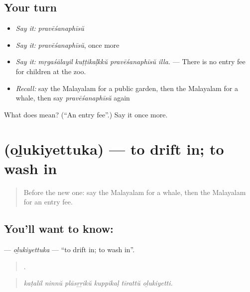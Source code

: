\subsection*{Your turn}
\begin{itemize}
\raggedright
  \item \emph{Say it:} \emph{pravēśanaphīsŭ}
  \item \emph{Say it:} \emph{pravēśanaphīsŭ}, once more
  \item \emph{Say it:} \emph{mṛgaśālayil kuṭṭikaḷkkŭ pravēśanaphīsŭ illa.} — There is no entry fee for children at the zoo.
  \item \emph{Recall:} say the Malayalam for a public garden, then the Malayalam for a whale, then say \emph{pravēśanaphīsŭ} again
\end{itemize}

\begin{tcolorbox}[breakable,colback=teal!4,colframe=teal!35!black,title={Before you move on}]
What does  mean? (\textquotedblleft{}An entry fee\textquotedblright{}.) Say it once more.
\end{tcolorbox}
\section[\texorpdfstring{\ml{ഒഴുകിയെത്തുക} (oḻukiyettuka)}{ഒഴുകിയെത്തുക (oḻukiyettuka)}]{ (oḻukiyettuka) — to drift in; to wash in}

\label{lesson:ML-C501-olukiyettuka}



\begin{quote}
Before the new one: say the Malayalam for a whale, then the Malayalam for an entry fee.
\end{quote}

\subsection*{You'll want to know: }
\textbf{} — \emph{oḻukiyettuka} — \textquotedblleft{}to drift in; to wash in\textquotedblright{}.

\begin{quote}
     .
\end{quote}

\begin{quote}
\emph{kaṭalil ninnŭ plāsṟṟikŭ kuppikaḷ tīrattŭ oḻukiyetti.}
\end{quote}

